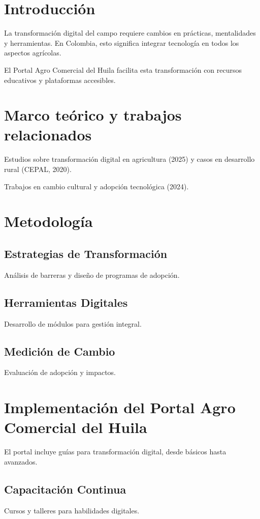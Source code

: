 \section{Introducción}

La transformación digital del campo requiere cambios en prácticas, mentalidades y herramientas. En Colombia, esto significa integrar tecnología en todos los aspectos agrícolas.

El Portal Agro Comercial del Huila facilita esta transformación con recursos educativos y plataformas accesibles.

\section{Marco teórico y trabajos relacionados}

Estudios sobre transformación digital en agricultura (2025) y casos en desarrollo rural (CEPAL, 2020).

Trabajos en cambio cultural y adopción tecnológica (2024).

\section{Metodología}

\subsection{Estrategias de Transformación}
Análisis de barreras y diseño de programas de adopción.

\subsection{Herramientas Digitales}
Desarrollo de módulos para gestión integral.

\subsection{Medición de Cambio}
Evaluación de adopción y impactos.

\section{Implementación del Portal Agro Comercial del Huila}

El portal incluye guías para transformación digital, desde básicos hasta avanzados.

\subsection{Capacitación Continua}
Cursos y talleres para habilidades digitales.

